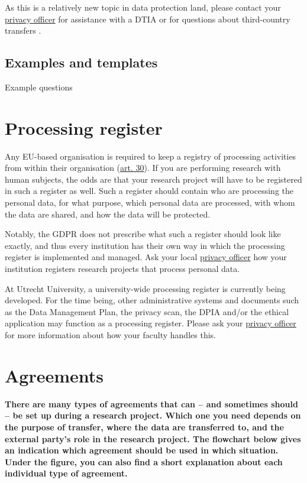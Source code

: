 \documentclass[
]{book}
\begin{document}
As this is a relatively new topic in data protection land, please contact your
\protect\hyperlink{support}{privacy officer}
for assistance with a DTIA or for questions about third-country transfers .

\hypertarget{examples-and-templates-4}{%
\subsection{Examples and templates}\label{examples-and-templates-4}}

Example questions

\hypertarget{processing-register}{%
\section{Processing register}\label{processing-register}}

Any EU-based organisation is required to keep a registry of processing
activities from within their organisation
(\href{https://gdpr-info.eu/art-30-gdpr/}{art. 30}).
If you are performing research with human subjects, the odds are that your
research project will have to be registered in such a register as well. Such a
register should contain who are processing the personal data, for what purpose,
which personal data are processed, with whom the data are shared, and how the
data will be protected.

Notably, the GDPR does not prescribe what such a register should look like
exactly, and thus every institution has their own way in which the processing
register is implemented and managed. Ask your local \protect\hyperlink{support}{privacy officer} how your
institution registers research projects that process personal data.

At Utrecht University, a university-wide processing register is currently being
developed. For the time being, other administrative systems and documents such as
the Data Management Plan, the privacy scan, the DPIA and/or the ethical
application may function as a processing register. Please ask your
\protect\hyperlink{support}{privacy officer} for more information about how your faculty handles this.

\hypertarget{agreements}{%
\section{Agreements}\label{agreements}}

\textbf{There are many types of agreements that can -- and sometimes should -- be set up
during a research project. Which one you need depends on the purpose of transfer,
where the data are transferred to, and the external party's role in the research
project. The flowchart below gives an indication which agreement should be used
in which situation. Under the figure, you can also find a short explanation
about each individual type of agreement.}
\end{document}
